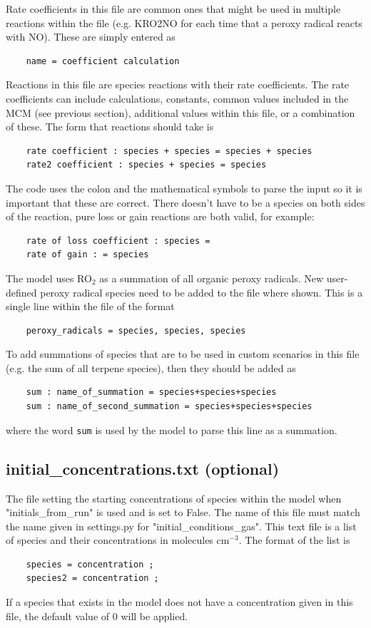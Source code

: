 \documentclass[a4paper]{refart}
\begin{document}
Rate coefficients in this file are common ones that might be used in multiple reactions within the file (e.g. KRO2NO for each time that a peroxy radical reacts with NO). These are simply entered as
\begin{verbatim}
    name = coefficient calculation
\end{verbatim}

Reactions in this file are species reactions with their rate coefficients. The rate coefficients can include calculations, constants, common values included in the MCM (see previous section), additional values within this file, or a combination of these. The form that reactions should take is
\begin{verbatim}
    rate coefficient : species + species = species + species
    rate2 coefficient : species + species = species
\end{verbatim}
The code uses the colon and the mathematical symbols to parse the input so it is important that these are correct. There doesn't have to be a species on both sides of the reaction, pure loss or gain reactions are both valid, for example:
\begin{verbatim}
    rate of loss coefficient : species = 
    rate of gain : = species
\end{verbatim}

The model uses RO$_2$ as a summation of all organic peroxy radicals. New user-defined peroxy radical species need to be added to the file where shown. This is a single line within the file of the format
\begin{verbatim}
    peroxy_radicals = species, species, species
\end{verbatim}

To add summations of species that are to be used in custom scenarios in this file (e.g. the sum of all terpene species), then they should be added as
\begin{verbatim}
    sum : name_of_summation = species+species+species
    sum : name_of_second_summation = species+species+species
\end{verbatim}
where the word \texttt{sum} is used by the model to parse this line as a summation.

\subsection{initial\_concentrations.txt (optional)}\label{initial_concentrations.txt}
The file setting the starting concentrations of species within the model when "initials\_from\_run" is used and is set to False. The name of this file must match the name given in settings.py for "initial\_conditions\_gas". This text file is a list of species and their concentrations in molecules cm$^{-3}$. The format of the list is
\begin{verbatim}
    species = concentration ;
    species2 = concentration ;
\end{verbatim}
If a species that exists in the model does not have a concentration given in this file, the default value of 0 will be applied. 
\end{document}
